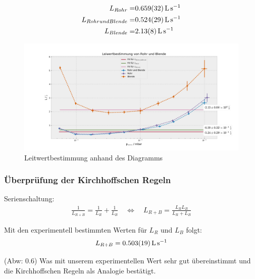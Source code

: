 \documentclass[12pt, a4paper]{scrartcl}
\begin{document}
        \begin{align*}
            L_{Rohr}=&\SI{.659+-.032}{\litre\per\second}\\
            L_{Rohr und Blende}=&\SI{.524+-.029}{\litre\per\second}\\
            L_{Blende}=&\SI{2.13+-0.08}{\litre\per\second}
        \end{align*}
        
        \begin{landscape}
        	\begin{figure}[h!]
        		\hspace*{-40mm}\includegraphics[width=1.8\textwidth]{../25-f1.png}
        		\caption{Leitwertbestimmung anhand des Diagramms}
        		\label{diagram:leitwert}
        	\end{figure}
        \end{landscape}
        
        \subsubsection*{Überprüfung der Kirchhoffschen Regeln}
        
        Serienschaltung:
        \begin{align}
			\frac 1{L_{R+B}} = \frac 1 {L_R} + \frac 1 {L_B} \quad \Leftrightarrow \quad L_{R+B} = \frac{L_R L_B}{L_R+L_B}
			\label{f:kirch}
        \end{align}
        
        Mit den experimentell bestimmten Werten für $L_R$ und $L_B$ folgt:
        \begin{align}
        	L_{R+B} = \SI{.503+-.019}{\litre\per\second}
        \end{align}
        
        (Abw: \SI{0.6}{\sigma}) Was mit unserem experimentellen Wert sehr gut übereinstimmt und die Kirchhoffschen Regeln als Analogie bestätigt.
        
\end{document}
